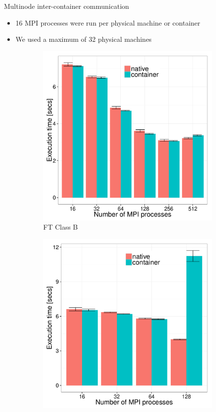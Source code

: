 \documentclass[11pt,xcolor=dvipsnames,presentation]{beamer}
\begin{document}
\begin{frame}[label=sec-3-0-9]{Multinode inter-container communication}
\begin{itemize}
\item 16 MPI processes were run per physical machine or container
\item We used a maximum of 32 physical machines
\end{itemize}

\begin{figure}
  \centering
  \begin{subfigure}[b]{0.42\textwidth}
    \includegraphics[scale=0.25,angle=0]{figures/veth_overhead-tso-ftB.pdf}
    \caption{FT Class B}
  \end{subfigure}
  \begin{subfigure}[b]{0.42\textwidth}
    \includegraphics[scale=0.25,angle=0]{figures/veth_overhead-tso-cgB.pdf}

\end{subfigure}
\end{figure}
\end{frame}
\end{document}
